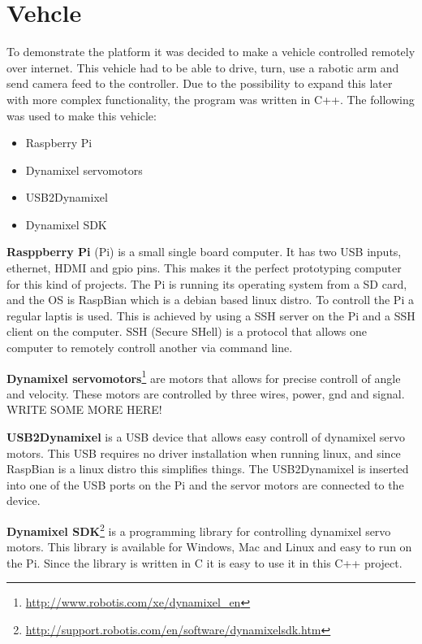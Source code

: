 \section{Vehcle}
To demonstrate the platform it was decided to make a vehicle controlled remotely over internet. 
This vehicle had to be able to drive, turn, use a rabotic arm and send camera feed to the controller. 
Due to the possibility to expand this later with more complex functionality, the program was written in C++.
The following was used to make this vehicle:
\begin{itemize}
    \item Raspberry Pi
    \item Dynamixel servomotors
    \item USB2Dynamixel
    \item Dynamixel SDK
\end{itemize}
\vspace{\secspace}

\textbf{Rasppberry Pi} (Pi) is a small single board computer. 
It has two USB inputs, ethernet, HDMI and gpio pins. 
This makes it the perfect prototyping computer for this kind of projects. 
The Pi is running its operating system from a SD card, and the OS is RaspBian which is a debian based linux distro. 
To controll the Pi a regular laptis is used. 
This is achieved by using a SSH server on the Pi and a SSH client on the computer. 
SSH (Secure SHell) is a protocol that allows one computer to remotely controll another via command line. 
\vspace{\secspace}

\textbf{Dynamixel servomotors}\footnote{\url{http://www.robotis.com/xe/dynamixel_en}} are motors that allows for precise controll of angle and velocity. 
These motors are controlled by three wires, power, gnd and signal. WRITE SOME MORE HERE!
\vspace{\secspace}

\textbf{USB2Dynamixel} is a USB device that allows easy controll of dynamixel servo motors. 
This USB requires no driver installation when running linux, and since RaspBian is a linux distro this simplifies things. 
The USB2Dynamixel is inserted into one of the USB ports on the Pi and the servor motors are connected to the device. 
\vspace{\secspace}

\textbf{Dynamixel SDK}\footnote{\url{http://support.robotis.com/en/software/dynamixelsdk.htm}} is a programming library for controlling dynamixel servo motors. 
This library is available for Windows, Mac and Linux and easy to run on the Pi. 
Since the library is written in C it is easy to use it in this C++ project. 

